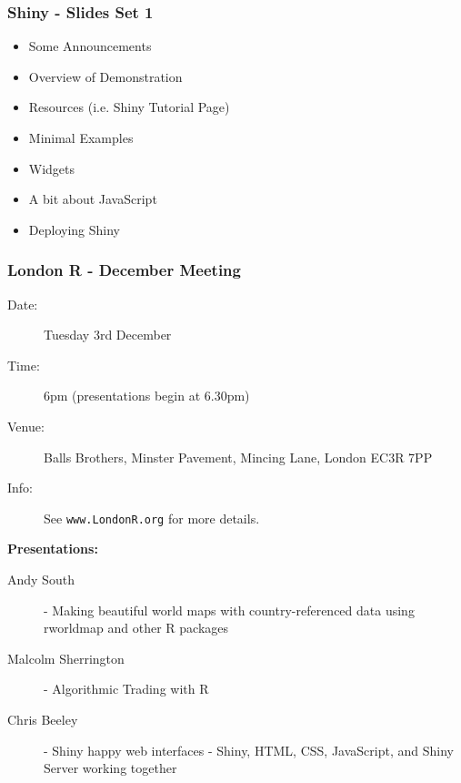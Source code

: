 \documentclass{beamer}
\begin{document}
\begin{frame}
\frametitle{Shiny - Slides Set 1}
\Large
\begin{itemize}
\item Some Announcements
\item Overview of Demonstration
\item Resources (i.e. Shiny Tutorial Page)
\item Minimal Examples 
\item Widgets
\item A bit about JavaScript
\item Deploying Shiny
\end{itemize}
\end{frame}
\begin{frame}
\frametitle{London R - December Meeting}

\begin{description}
\item[Date:]  Tuesday 3rd December

\item[Time:]  6pm (presentations begin at 6.30pm)

\item[Venue:]  Balls Brothers, Minster Pavement, Mincing Lane, London EC3R 7PP
\item[Info:] See \texttt{www.LondonR.org} for more details.
\end{description}
\textbf{Presentations:}
\begin{description}
\item[Andy South] - Making beautiful world maps with country-referenced data using rworldmap and other R packages
\item[Malcolm Sherrington] - Algorithmic Trading with R
\item[Chris Beeley] - Shiny happy web interfaces - Shiny, HTML, CSS, JavaScript, and Shiny Server working together
\end{description}
\end{frame}
\end{document}
